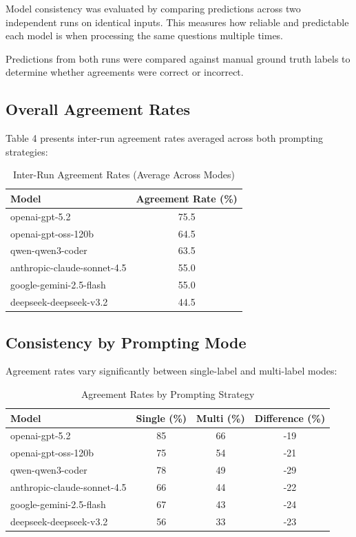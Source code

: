 \documentclass[12pt,a4paper]{article}
\begin{document}
Model consistency was evaluated by comparing predictions across two independent runs on identical inputs. This measures how reliable and predictable each model is when processing the same questions multiple times. 

Predictions from both runs were compared against manual ground truth labels to determine whether agreements were correct or incorrect.

\subsection{Overall Agreement Rates}

Table 4 presents inter-run agreement rates averaged across both prompting strategies:

\begin{table}[H]
\centering
\begin{tabular}{lc}
\toprule
\textbf{Model} & \textbf{Agreement Rate (\%)} \\
\midrule
openai-gpt-5.2 & 75.5 \\
openai-gpt-oss-120b & 64.5 \\
qwen-qwen3-coder & 63.5 \\
anthropic-claude-sonnet-4.5 & 55.0 \\
google-gemini-2.5-flash & 55.0 \\
deepseek-deepseek-v3.2 & 44.5 \\
\bottomrule
\end{tabular}
\caption{Inter-Run Agreement Rates (Average Across Modes)}
\end{table}

\subsection{Consistency by Prompting Mode}

Agreement rates vary significantly between single-label and multi-label modes:

\begin{table}[H]
\centering
\begin{tabular}{lccc}
\toprule
\textbf{Model} & \textbf{Single (\%)} & \textbf{Multi (\%)} & \textbf{Difference (\%)} \\
\midrule
openai-gpt-5.2 & 85 & 66 & -19 \\
openai-gpt-oss-120b & 75 & 54 & -21 \\
qwen-qwen3-coder & 78 & 49 & -29 \\
anthropic-claude-sonnet-4.5 & 66 & 44 & -22 \\
google-gemini-2.5-flash & 67 & 43 & -24 \\
deepseek-deepseek-v3.2 & 56 & 33 & -23 \\
\bottomrule
\end{tabular}
\caption{Agreement Rates by Prompting Strategy}
\end{table}
\end{document}
